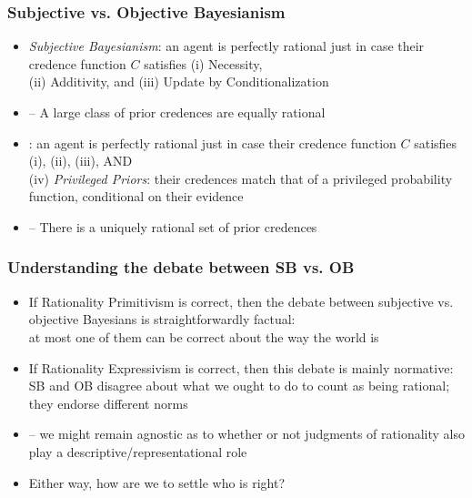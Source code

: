 \begin{frame}
\frametitle{Subjective vs. Objective Bayesianism}

\begin{itemize}[<+->]

\item \emph{Subjective Bayesianism}: an agent is perfectly rational just in case their credence function $C$ satisfies (i) Necessity, \\ (ii) Additivity, and (iii) Update by Conditionalization

\item[] -- A large class of prior credences are equally rational

\item  {}: an agent is perfectly rational just in case their credence function $C$ satisfies (i), (ii), (iii), AND \\ (iv) \textit{Privileged Priors}: their credences match that of a privileged probability function, conditional on their evidence

\item[] -- There is a uniquely rational set of prior credences

\end{itemize}
\end{frame}

\begin{frame}
\frametitle{Understanding the debate between SB vs. OB}

\begin{itemize}[<+->]

\item If \textcolor{OGlyallpink}{Rationality Primitivism} is correct, then the debate between subjective vs. objective Bayesians is straightforwardly factual: \\ at most one of them can be correct about the way the world is

\item If \textcolor{highlightA}{Rationality Expressivism} is correct, then this debate is mainly normative: SB and OB disagree about what we ought to do to count as being rational; they endorse different norms

\item -- we might remain agnostic as to whether or not judgments of rationality also play a descriptive/representational role 

\item Either way, how are we to settle who is right?

\end{itemize}
\end{frame}

